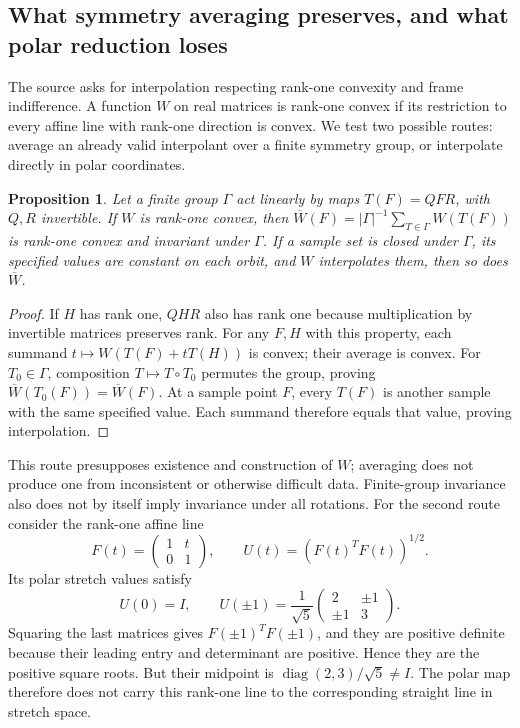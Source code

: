 \documentclass[11pt]{article}
\newtheorem{proposition}{Proposition}
\begin{document}
\subsection{What symmetry averaging preserves, and what polar reduction loses}
The source asks for interpolation respecting rank-one convexity and frame indifference. A function $W$ on real matrices is rank-one convex if its restriction to every affine line with rank-one direction is convex. We test two possible routes: average an already valid interpolant over a finite symmetry group, or interpolate directly in polar coordinates.
\begin{proposition}
Let a finite group $\Gamma$ act linearly by maps $T(F)=QFR$, with $Q,R$ invertible. If $W$ is rank-one convex, then $\overline W(F)=|\Gamma|^{-1}\sum_{T\in\Gamma}W(T(F))$ is rank-one convex and invariant under $\Gamma$. If a sample set is closed under $\Gamma$, its specified values are constant on each orbit, and $W$ interpolates them, then so does $\overline W$.
\end{proposition}
\begin{proof}
If $H$ has rank one, $QHR$ also has rank one because multiplication by invertible matrices preserves rank. For any $F,H$ with this property, each summand $t\mapsto W(T(F)+tT(H))$ is convex; their average is convex. For $T_0\in\Gamma$, composition $T\mapsto T\circ T_0$ permutes the group, proving $\overline W(T_0(F))=\overline W(F)$. At a sample point $F$, every $T(F)$ is another sample with the same specified value. Each summand therefore equals that value, proving interpolation.
\end{proof}
This route presupposes existence and construction of $W$; averaging does not produce one from inconsistent or otherwise difficult data. Finite-group invariance also does not by itself imply invariance under all rotations.
For the second route consider the rank-one affine line
\[
F(t)=\begin{pmatrix}1&t\\0&1\end{pmatrix},\qquad U(t)=(F(t)^TF(t))^{1/2}.
\]
Its polar stretch values satisfy
\[
U(0)=I,\qquad U(\pm1)=\frac1{\sqrt5}\begin{pmatrix}2&\pm1\\\pm1&3\end{pmatrix}.
\]
Squaring the last matrices gives $F(\pm1)^TF(\pm1)$, and they are positive definite because their leading entry and determinant are positive. Hence they are the positive square roots. But their midpoint is $\operatorname{diag}(2,3)/\sqrt5\ne I$. The polar map therefore does not carry this rank-one line to the corresponding straight line in stretch space.
\end{document}
